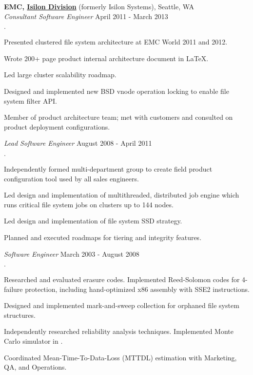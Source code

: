 \documentclass[11pt]{article}
\newenvironment{achievements}{\begin{list}{\bf \Large $\cdot$}{\topsep 2pt \itemsep 0pt}}{\vspace*{3pt}\end{list}}
\begin{document}
{\bf EMC, \href{http://www.isilon.com}{Isilon Division}} (formerly Isilon Systems), Seattle, WA \\
  {\em Consultant Software Engineer} \hfill April 2011 - March 2013
  \begin{achievements}
  \item Presented clustered file system architecture at EMC World 2011 and 2012.
  \item Wrote 200+ page product internal architecture document in \LaTeX.
  \item Led large cluster scalability roadmap.
  \item Designed and implemented new BSD vnode operation locking to enable
    file system filter API.
  \item Member of product architecture team; met with customers and consulted
    on product deployment configurations.
  \end{achievements}

  {\em Lead Software Engineer} \hfill August 2008 - April 2011
  \begin{achievements}
  \item Independently formed multi-department group to create field product
    configuration tool used by all sales engineers.
  \item Led design and implementation of multithreaded, distributed job engine which runs critical file system jobs on clusters up to 144 nodes.
  \item Led design and implementation of file system SSD strategy.
  \item Planned and executed roadmaps for tiering and integrity features.
  \end{achievements}

  {\em Software Engineer} \hfill March 2003 - August 2008
  \begin{achievements}
  \item Researched and evaluated erasure codes.  Implemented Reed-Solomon
    codes for 4-failure protection, including hand-optimized x86 assembly with
    SSE2 instructions.
  \item Designed and implemented mark-and-sweep collection for orphaned file
    system structures.
  \item Independently researched reliability analysis techniques.  Implemented
    Monte Carlo simulator in \cpluspluslogo{}.
  \item Coordinated Mean-Time-To-Data-Loss (MTTDL) estimation with Marketing, QA, and Operations.
  \end{achievements}
\end{document}

